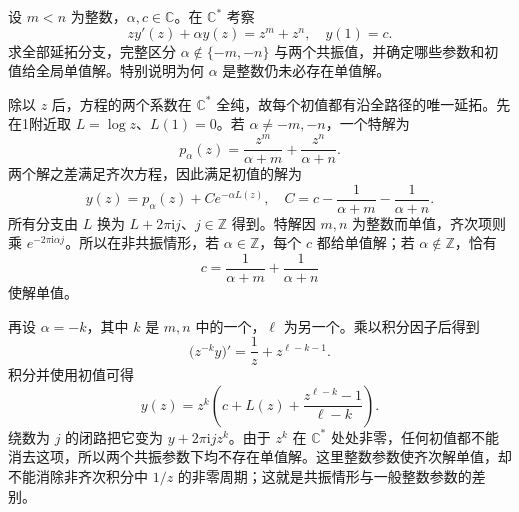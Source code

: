 \begin{exercise}\label{b3:ex:09-4}
设 \(m<n\) 为整数，\(\alpha,c\in\mathbb C\)。在 \(\mathbb C^*\) 考察
\[
 zy'(z)+\alpha y(z)=z^m+z^n,\quad y(1)=c.
\]
求全部延拓分支，完整区分 \(\alpha\notin\{-m,-n\}\) 与两个共振值，并确定哪些参数和初值给全局单值解。特别说明为何 \(\alpha\) 是整数仍未必存在单值解。
\end{exercise}
\begin{solution}
除以 \(z\) 后，方程的两个系数在 \(\mathbb C^*\) 全纯，故每个初值都有沿全路径的唯一延拓。先在1附近取 \(L=\log z\)、\(L(1)=0\)。若 \(\alpha\ne-m,-n\)，一个特解为
\[
 p_\alpha(z)=\frac{z^m}{\alpha+m}+\frac{z^n}{\alpha+n}.
\]
两个解之差满足齐次方程，因此满足初值的解为
\[
 y(z)=p_\alpha(z)+C e^{-\alpha L(z)},\quad
 C=c-\frac1{\alpha+m}-\frac1{\alpha+n}.
\]
所有分支由 \(L\) 换为 \(L+2\pi\mathrm i j\)、\(j\in\mathbb Z\) 得到。特解因 \(m,n\) 为整数而单值，齐次项则乘 \(e^{-2\pi\mathrm i\alpha j}\)。所以在非共振情形，若 \(\alpha\in\mathbb Z\)，每个 \(c\) 都给单值解；若 \(\alpha\notin\mathbb Z\)，恰有
\[
 c=\frac1{\alpha+m}+\frac1{\alpha+n}
\]
使解单值。

再设 \(\alpha=-k\)，其中 \(k\) 是 \(m,n\) 中的一个，\(\ell\) 为另一个。乘以积分因子后得到
\[
 \bigl(z^{-k}y\bigr)'=\frac1z+z^{\ell-k-1}.
\]
积分并使用初值可得
\[
 y(z)=z^k\left(c+L(z)+\frac{z^{\ell-k}-1}{\ell-k}\right).
\]
绕数为 \(j\) 的闭路把它变为 \(y+2\pi\mathrm i j z^k\)。由于 \(z^k\) 在 \(\mathbb C^*\) 处处非零，任何初值都不能消去这项，所以两个共振参数下均不存在单值解。这里整数参数使齐次解单值，却不能消除非齐次积分中 \(1/z\) 的非零周期；这就是共振情形与一般整数参数的差别。
\end{solution}

